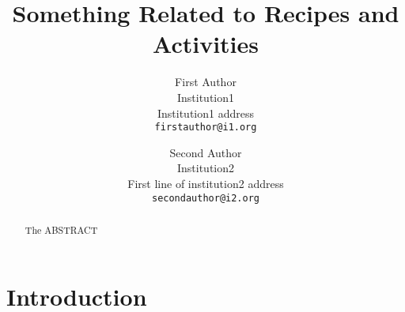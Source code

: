 \documentclass[10pt,twocolumn,letterpaper]{article}
\begin{document}
\title{Something Related to Recipes and Activities}

\author{First Author\\
Institution1\\
Institution1 address\\
{\tt\small firstauthor@i1.org}
\and
Second Author\\
Institution2\\
First line of institution2 address\\
{\tt\small secondauthor@i2.org}
}

\maketitle


\begin{abstract}
   The ABSTRACT
\end{abstract}

\section{Introduction}


{\small


}
\end{document}
